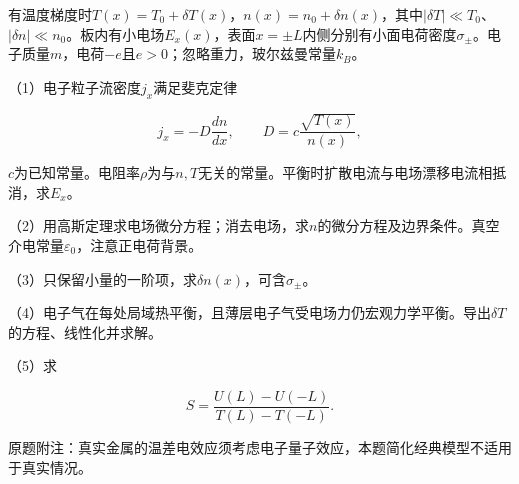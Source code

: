 \documentclass[12pt,a4paper,fontset=fandol]{ctexart}
\begin{document}
有温度梯度时\(T(x)=T_0+\delta T(x)\)，\(n(x)=n_0+\delta n(x)\)，其中\(|\delta T|\ll T_0\)、\(|\delta n|\ll n_0\)。板内有小电场\(E_x(x)\)，表面\(x=\pm L\)内侧分别有小面电荷密度\(\sigma_\pm\)。电子质量\(m\)，电荷\(-e\)且\(e>0\)；忽略重力，玻尔兹曼常量\(k_B\)。

\begin{center}
\begin{minipage}{\linewidth}
\centering\begingroup{}
\ifdim\wd\diagrambox>.88\linewidth
\sbox{\diagrambox}{\resizebox{.88\linewidth}{!}{\usebox{\diagrambox}}}\fi
\ifdim\ht\diagrambox>.20\textheight
\resizebox{!}{.20\textheight}{\usebox{\diagrambox}}
\else\usebox{\diagrambox}\fi
\par{}\endgroup\end{minipage}\end{center}

（1）电子粒子流密度\(j_x\)满足斐克定律

\[
j_x=-D\frac{dn}{dx},\qquad
D=c\frac{\sqrt{T(x)}}{n(x)},
\]

\(c\)为已知常量。电阻率\(\rho\)为与\(n,T\)无关的常量。平衡时扩散电流与电场漂移电流相抵消，求\(E_x\)。

（2）用高斯定理求电场微分方程；消去电场，求\(n\)的微分方程及边界条件。真空介电常量\(\varepsilon_0\)，注意正电荷背景。

（3）只保留小量的一阶项，求\(\delta n(x)\)，可含\(\sigma_\pm\)。

（4）电子气在每处局域热平衡，且薄层电子气受电场力仍宏观力学平衡。导出\(\delta T\)的方程、线性化并求解。

（5）求

\[
S=\frac{U(L)-U(-L)}{T(L)-T(-L)}.
\]

原题附注：真实金属的温差电效应须考虑电子量子效应，本题简化经典模型不适用于真实情况。
\end{document}
